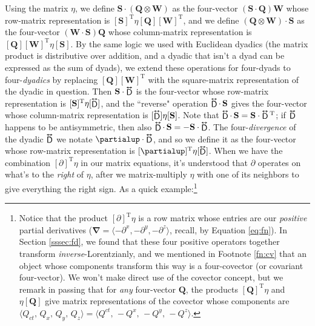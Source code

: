 \documentclass[12pt]{article}
\renewcommand{\vv}[1]{\mathbf{#1}}
\newcommand{\del}{\boldsymbol{\nabla}}
\newcommand{\tightoverset}[2]{%
  \mathop{#2}\limits^{\vbox to -.5ex{\kern-0.75ex\hbox{$#1$}\vss}}}
\newcommand{\inlinedy}[1]{\tightoverset{\text{\tiny$\bm\leftrightarrow$}}{#1}}
\begin{document}
Using the matrix $\eta$, we define $\vv S \cdot (\vv Q \otimes \vv W)$ as the four-vector $(\vv S \cdot \vv Q) \vv W$ whose row-matrix representation is $[\vv S]^\mathrm{T} \eta [\vv Q] [\vv W]^\mathrm{T}$, and we define $(\vv Q \otimes \vv W) \cdot \vv S$ as the four-vector $(\vv W \cdot \vv S) \vv Q$ whose column-matrix representation is $[\vv Q] [\vv W]^\mathrm{T} \eta [\vv S]$. By the same logic we used with Euclidean dyadics (the matrix product is distributive over addition, and a dyadic that isn't a dyad can be expressed as the sum of dyads), we extend these operations for four-dyads to four-\emph{dyadics} by replacing $[\vv Q][\vv W]^{\textrm{T}}$ with the square-matrix representation of the dyadic in question. Then $\vv S \cdot \inlinedy{\mathsf{D}}$ is the four-vector whose row-matrix representation is $[\vv S]^{\mathrm{T}} \eta [\inlinedy{\mathsf{D}}]$, and the ``reverse" operation $\inlinedy{\mathsf{D}} \cdot \, \vv S$ gives the four-vector whose column-matrix representation is $[\inlinedy{\mathsf{D}}] \eta [\vv S]$. Note that $\inlinedy{\mathsf{D}} \cdot \, \vv S = \vv S \cdot \inlinedy{\mathsf{D}} {}^\mathrm{T}$; if $\inlinedy{\mathsf{D}}$ happens to be antisymmetric, then also $\inlinedy{\mathsf{D}} \cdot \, \vv S = - \vv S \cdot \inlinedy{\mathsf{D}}$. The four-\emph{divergence} of the dyadic $\inlinedy{\mathsf{D}}$ we notate $\partialup \cdot \inlinedy{\mathsf{D}}$, and so we define it as the four-vector whose row-matrix representation is $[\partialup]^{\mathrm{T}} \eta [\inlinedy{\mathsf{D}}]$. When we have the combination $[\partialup]^\mathrm{T} \eta$ in our matrix equations, it's understood that $\partialup$ operates on what's to the \emph{right} of $\eta$, after we matrix-multiply $\eta$ with one of its neighbors to give everything the right sign. As a quick example:\footnote{Notice that the product $[\partialup]^\mathrm{T} \eta$ is a row matrix whose entries are our \emph{positive} partial derivatives ($\del = \langle - \partial^x , - \partial^y , - \partial^z \rangle$, recall, by Equation \ref{eq:fn}). In Section \ref{sssec:fd}, we found that these four positive operators together transform \emph{inverse}-Lorentzianly, and we mentioned in Footnote \ref{fn:cv} that an object whose components transform this way is a four-covector (or covariant four-vector). We won't make direct use of the covector concept, but we remark in passing that for \emph{any} four-vector $\vv Q$, the products $[\vv Q]^\mathrm{T} \eta$ and $\eta [\vv Q]$ give matrix representations of the covector whose components are $\langle Q_{ct}, \, Q_x, \, Q_y, \, Q_z \rangle = \langle Q^{ct}, \, -Q^x, \, -Q^y, \, -Q^z \rangle$.}
\end{document}
